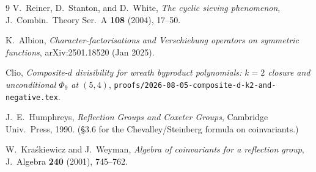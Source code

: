\documentclass[11pt]{article}
\theoremstyle{remark}
\begin{document}
\begin{thebibliography}{9}
 V.~Reiner, D.~Stanton, and D.~White,
\emph{The cyclic sieving phenomenon},
J.~Combin.~Theory Ser.~A \textbf{108} (2004), 17--50.

 K.~Albion,
\emph{Character-factorisations and Verschiebung operators on symmetric functions},
arXiv:2501.18520 (Jan 2025).

 Clio,
\emph{Composite-$d$ divisibility for wreath byproduct polynomials: $k=2$ closure and unconditional $\Phi_9$ at $(5,4)$},
\texttt{proofs/2026-08-05-composite-d-k2-and-negative.tex}.

 J.~E.~Humphreys,
\emph{Reflection Groups and Coxeter Groups},
Cambridge Univ.~Press, 1990. (\S 3.6 for the Chevalley/Steinberg formula on coinvariants.)

 W.~Kra\'skiewicz and J.~Weyman,
\emph{Algebra of coinvariants for a reflection group},
J.~Algebra \textbf{240} (2001), 745--762.
\end{thebibliography}
\end{document}

